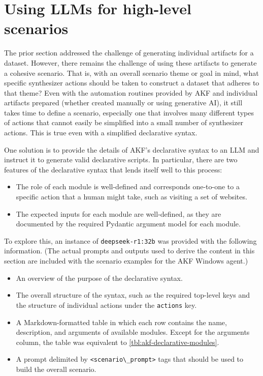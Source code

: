 \documentclass[letterpaper,12pt]{report}
\def\tightlist{}
\newcommand{\passthrough}[1]{#1}
\begin{document}
\section{Using LLMs for high-level
scenarios}\label{using-llms-for-high-level-scenarios}

The prior section addressed the challenge of generating individual
artifacts for a dataset. However, there remains the challenge of using
these artifacts to generate a cohesive scenario. That is, with an
overall scenario theme or goal in mind, what specific synthesizer
actions should be taken to construct a dataset that adheres to that
theme? Even with the automation routines provided by AKF and individual
artifacts prepared (whether created manually or using generative AI), it
still takes time to define a scenario, especially one that involves many
different types of actions that cannot easily be simplified into a small
number of synthesizer actions. This is true even with a simplified
declarative syntax.

One solution is to provide the details of AKF's declarative syntax to an
LLM and instruct it to generate valid declarative scripts. In
particular, there are two features of the declarative syntax that lends
itself well to this process:

\begin{itemize}
\tightlist
\item
  The role of each module is well-defined and corresponds one-to-one to
  a specific action that a human might take, such as visiting a set of
  websites.
\item
  The expected inputs for each module are well-defined, as they are
  documented by the required Pydantic argument model for each module.
\end{itemize}

To explore this, an instance of
\passthrough{\lstinline!deepseek-r1:32b!} was provided with the
following information. (The actual prompts and outputs used to derive
the content in this section are included with the scenario examples for
the AKF Windows agent.)

\begin{itemize}
\tightlist
\item
  An overview of the purpose of the declarative syntax.
\item
  The overall structure of the syntax, such as the required top-level
  keys and the structure of individual actions under the
  \passthrough{\lstinline!actions!} key.
\item
  A Markdown-formatted table in which each row contains the name,
  description, and arguments of available modules. Except for the
  arguments column, the table was equivalent to
  \autoref{tbl:akf-declarative-modules}.
\item
  A prompt delimited by \passthrough{\lstinline!<scenario\_prompt>!}
  tags that should be used to build the overall scenario.
\end{itemize}
\end{document}
